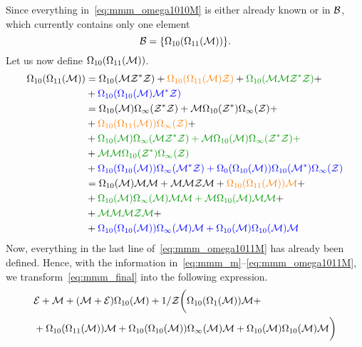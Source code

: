 \documentclass[12pt, a4paper, twoside]{report}
\begin{document}
Since everything in~\eqref{eq:mmm_omega1010M} is either already known or in $\mathcal{B}$, which currently contains only one element
$$\mathcal{B} = \{\Omega_{10}(\Omega_{11}(\mathcal{M}))\}.$$
Let us now define $\Omega_{10}(\Omega_{11}(\mathcal{M}))$. 
\begin{align}
  \begin{aligned}
    \Omega_{10}(\Omega_{11}(\M)) &= \Omega_{10}(\M\Zstar\Z) + \textcolor{orange}{\Omega_{10}(\Omega_{11}(\M)\Z)} + \textcolor{green}{\Omega_{10}(\M\M\Zstar\Z)} +\\
    &+\textcolor{blue}{\Omega_{10}(\Omega_{10}(\M)\Mstar\Z)}\\
    &= \Omega_{10}(\M)\Omega_\infty(\Zstar\Z) + \M\Omega_{10}(\Zstar)\Omega_\infty(\Z) +\\
    &+ \textcolor{orange}{\Omega_{10}(\Omega_{11}(\M))\Omega_\infty(\Z)} +\\
    &+ \textcolor{green}{\Omega_{10}(\M)\Omega_\infty(\M\Zstar\Z) + \M\Omega_{10}(\M)\Omega_\infty(\Zstar\Z) +}\\
    &+ \textcolor{green}{\M\M\Omega_{10}(\Zstar)\Omega_\infty(\Z)}\\
    &+ \textcolor{blue}{\Omega_{10}(\Omega_{10}(\M))\Omega_\infty(\Mstar\Z) + \Omega_0(\Omega_{10}(\M))\Omega_{10}(\Mstar)\Omega_\infty(\Z)}\\
    &= \Omega_{10}(\M)\M\M + \M\M\Z\M + \textcolor{orange}{\Omega_{10}(\Omega_{11}(\M))\M} +\\
    &+ \textcolor{green}{\Omega_{10}(\M)\Omega_\infty(\M)\M\M + \M\Omega_{10}(\M)\M\M} +\\
    &+ \textcolor{green}{\M\M\M\Z\M} +\\
    &+ \textcolor{blue}{\Omega_{10}(\Omega_{10}(\M))\Omega_\infty(\M)\M + \Omega_{10}(\M)\Omega_{10}(\M)\M}
  \end{aligned}
      \label{eq:mmm_omega1011M}
\end{align}
Now, everything in the last line of~\eqref{eq:mmm_omega1011M} has already been defined. Hence, with the information in~\eqref{eq:mmm_m}--\eqref{eq:mmm_omega1011M}, we transform~\eqref{eq:mmm_final} into the following expression.
\begin{align}
  \begin{aligned}
  &\mathcal{E} + \mathcal{M} + (\mathcal{M} + \mathcal{E})\Omega_{10}(\mathcal{M}) +1/\mathcal{Z}\bigg(\Omega_{10}(\Omega_1(\mathcal{M}))\mathcal{M} +\\
     &+\Omega_{10}(\Omega_{11}(\mathcal{M}))\mathcal{M} +\Omega_{10}(\Omega_{10}(\mathcal{M}))\Omega_\infty(\mathcal{M})\mathcal{M} + \Omega_{10}(\mathcal{M})\Omega_{10}(\mathcal{M})\mathcal{M}\bigg)
   \end{aligned}
\label{eq:mmm_combspec_final}
\end{align}
\end{document}

